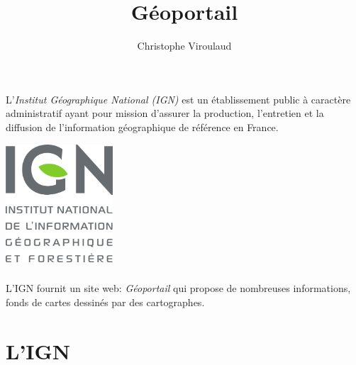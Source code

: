 \documentclass[svgnames,11pt]{beamer}
\author[]{Christophe Viroulaud}
\title{Géoportail}
\date{\framebox{\textbf{Loc 02}}}
\institute{Seconde - SNT}
\begin{document}
\begin{frame}
    \titlepage
\end{frame}
\begin{frame}
    \frametitle{}

    L'\emph{Institut Géographique National (IGN)} est un établissement public à caractère administratif ayant pour mission d'assurer la production, l'entretien et la diffusion de l'information géographique de référence en France.
    \begin{center}
        \centering
        \includegraphics[width=4cm]{ressources/ign.png}
    \end{center}
\end{frame}
\begin{frame}
    \frametitle{}
    L'IGN fournit un site web: \emph{Géoportail} qui propose de nombreuses informations, fonds de cartes dessinés par des cartographes.
    \begin{center}
    \end{center}

\end{frame}
\section{L'IGN}
\end{document}
